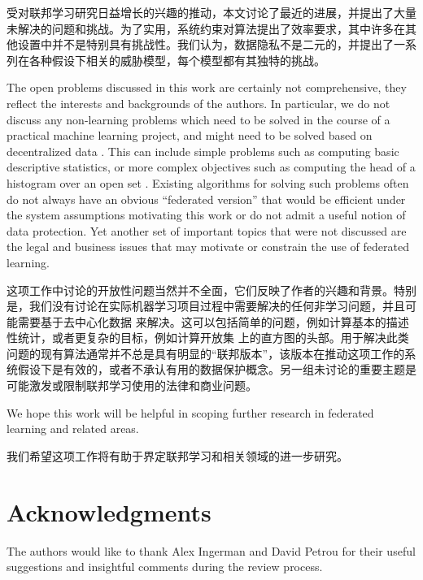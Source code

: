 \documentclass[10pt]{article}
\begin{document}
受对联邦学习研究日益增长的兴趣的推动，本文讨论了最近的进展，并提出了大量未解决的问题和挑战。为了实用，系统约束对算法提出了效率要求，其中许多在其他设置中并不是特别具有挑战性。我们认为，数据隐私不是二元的，并提出了一系列在各种假设下相关的威胁模型，每个模型都有其独特的挑战。

The open problems discussed in this work are certainly not comprehensive, they reflect the interests and backgrounds of the authors. In particular, we do not discuss any non-learning problems which need to be solved in the course of a practical machine learning project, and might need to be solved based on decentralized data \cite{fablog20}. This can include simple problems such as computing basic descriptive statistics, or more complex objectives such as computing the head of a histogram over an open set \cite{zhu2019federated}. Existing algorithms for solving such problems often do not always have an obvious ``federated version'' that would be efficient under the system assumptions motivating this work or do not admit a useful notion of data protection. Yet another set of important topics that were not discussed are the legal and business issues that may motivate or constrain the use of federated learning. 

这项工作中讨论的开放性问题当然并不全面，它们反映了作者的兴趣和背景。特别是，我们没有讨论在实际机器学习项目过程中需要解决的任何非学习问题，并且可能需要基于去中心化数据 \cite{fablog20} 来解决。这可以包括简单的问题，例如计算基本的描述性统计，或者更复杂的目标，例如计算开放集 \cite{zhu2019federated} 上的直方图的头部。用于解决此类问题的现有算法通常并不总是具有明显的“联邦版本”，该版本在推动这项工作的系统假设下是有效的，或者不承认有用的数据保护概念。另一组未讨论的重要主题是可能激发或限制联邦学习使用的法律和商业问题。


We hope this work will be helpful in scoping further research in federated learning and related areas.

我们希望这项工作将有助于界定联邦学习和相关领域的进一步研究。
\section*{Acknowledgments}

The authors would like to thank Alex Ingerman and David Petrou for their useful suggestions and insightful comments during the review process. 

\pagebreak

\begin{small}

\end{small}

\appendix
\end{document}
